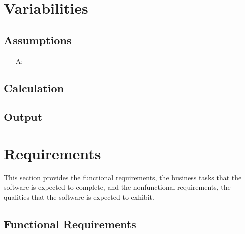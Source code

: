 \documentclass[12pt]{article}
\newcounter{assumpnum} %
\begin{document}
\section{Variabilities}

\subsection{Assumptions}

\begin{itemize}

\item[A\refstepcounter{assumpnum}\theassumpnum \label{A_meaningfulLabel}:]

\end{itemize}

\subsection{Calculation} \label{sec_Calculation}

\subsection{Output} \label{sec_Output}    

\section{Requirements}

This section provides the functional requirements, the business tasks that the
software is expected to complete, and the nonfunctional requirements, the
qualities that the software is expected to exhibit.

\subsection{Functional Requirements}
\end{document}
